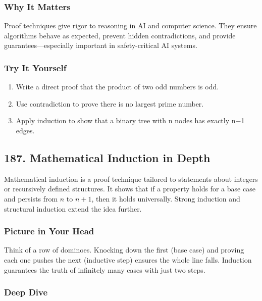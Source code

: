 \documentclass[
  letterpaper,
  DIV=11,
  numbers=noendperiod]{scrreprt}
\providecommand{\tightlist}{%
  \setlength{\itemsep}{0pt}\setlength{\parskip}{0pt}}
\begin{document}
\subsubsection{Why It Matters}\label{why-it-matters-83}

Proof techniques give rigor to reasoning in AI and computer science.
They ensure algorithms behave as expected, prevent hidden
contradictions, and provide guarantees---especially important in
safety-critical AI systems.

\subsubsection{Try It Yourself}\label{try-it-yourself-185}

\begin{enumerate}
\def\labelenumi{\arabic{enumi}.}
\tightlist
\item
  Write a direct proof that the product of two odd numbers is odd.
\item
  Use contradiction to prove there is no largest prime number.
\item
  Apply induction to show that a binary tree with n nodes has exactly
  n−1 edges.
\end{enumerate}

\subsection{187. Mathematical Induction in
Depth}\label{mathematical-induction-in-depth}

Mathematical induction is a proof technique tailored to statements about
integers or recursively defined structures. It shows that if a property
holds for a base case and persists from \(n\) to \(n+1\), then it holds
universally. Strong induction and structural induction extend the idea
further.

\subsubsection{Picture in Your Head}\label{picture-in-your-head-186}

Think of a row of dominoes. Knocking down the first (base case) and
proving each one pushes the next (inductive step) ensures the whole line
falls. Induction guarantees the truth of infinitely many cases with just
two steps.

\subsubsection{Deep Dive}\label{deep-dive-186}
\end{document}
